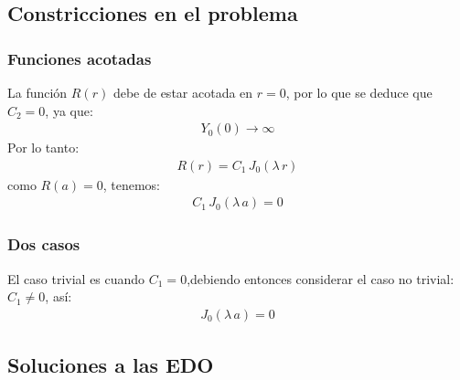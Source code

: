 \documentclass[12pt]{beamer}
\begin{document}
\subsection{Constricciones en el problema}

\begin{frame}
\frametitle{Funciones acotadas}
La función $R(r)$ debe de estar acotada en $r = 0$, por lo que se deduce que $C_{2} = 0$, ya que:
\pause
\begin{align*}
Y_{0}(0) \to \infty
\end{align*}
\pause
Por lo tanto:
\pause
\begin{align*}
R(r) = C_{1} \, J_{0}(\lambda \, r)
\end{align*}
\pause
como $R(a) = 0$, tenemos:
\pause
\begin{align*}
C_{1} \, J_{0} (\lambda \, a) = 0
\end{align*}
\end{frame}
\begin{frame}
\frametitle{Dos casos}
El caso trivial es cuando $C_{1} = 0$,\pause debiendo entonces considerar el caso no trivial: $C_{1} \neq 0$, así:
\pause
\begin{align}
J_{0} (\lambda \, a) = 0
\label{eq:ecuacion_CilBessel_05}
\end{align}
\end{frame}

\subsection{Soluciones a las EDO}
\end{document}
